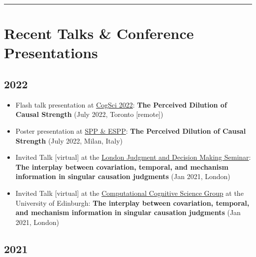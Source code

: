 \documentclass[
]{article}
\begin{document}
\begin{center}\rule{0.5\linewidth}{0.5pt}\end{center}

\hfill\break

\hypertarget{recent-talks-conference-presentations}{%
\section{Recent Talks \& Conference
Presentations}\label{recent-talks-conference-presentations}}

\hypertarget{section}{%
\subsection{2022}\label{section}}

\begin{itemize}
\item
  Flash talk presentation at
  \href{https://cognitivesciencesociety.org/cogsci-2022/}{CogSci 2022}:
  \textbf{The Perceived Dilution of Causal Strength} (July 2022, Toronto
  {[}remote{]}) {\href{publications/Dilution_Poster_2022.pdf}{}}
\item
  Poster presentation at \href{https://espp-spp-2022.com/}{SPP \& ESPP}:
  \textbf{The Perceived Dilution of Causal Strength} (July 2022, Milan,
  Italy) {\href{publications/Dilution_Poster_2022.pdf}{}}
\item
  Invited Talk {[}virtual{]} at the
  \href{https://www.ucl.ac.uk/pals/london-judgment-and-decision-making-seminars}{London
  Judgment and Decision Making Seminar}: \textbf{The interplay between
  covariation, temporal, and mechanism information in singular causation
  judgments} (Jan 2021, London)
\item
  Invited Talk {[}virtual{]} at the
  \href{https://www.ucl.ac.uk/pals/london-judgment-and-decision-making-seminars}{Computational
  Cognitive Science Group} at the University of Edinburgh: \textbf{The
  interplay between covariation, temporal, and mechanism information in
  singular causation judgments} (Jan 2021, London)
\end{itemize}

\hypertarget{section-1}{%
\subsection{2021}\label{section-1}}
\end{document}
